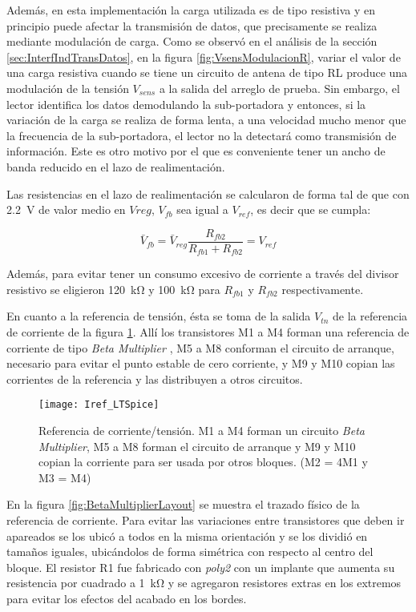 Además, en esta implementación la carga utilizada es de tipo 
resistiva y en principio puede afectar la transmisión de datos, que 
precisamente se realiza mediante modulación de carga. Como se 
observó en el análisis de la sección \ref{sec:InterfIndTransDatos}, 
en la figura \ref{fig:VsensModulacionR}, variar el valor de una 
carga resistiva cuando se tiene un circuito de antena de tipo RL 
produce una modulación de la tensión \(V_{sens}\) a la salida del 
arreglo de prueba. Sin embargo, el lector identifica los datos 
demodulando la sub-portadora y entonces, si la variación de la carga 
se realiza de forma lenta, a una velocidad mucho menor que la 
frecuencia de la sub-portadora, el lector no la detectará como 
transmisión de información. Este es otro motivo por el que es 
conveniente tener un ancho de banda reducido en el lazo de 
realimentación. 

Las resistencias en el lazo de realimentación se calcularon de forma 
tal de que con \SI{2.2}{\volt} de valor medio en \(Vreg\), \(V_{fb}\) 
sea igual a \(V_{ref}\), es decir que se cumpla:

\begin{equation*}
	\bar{V}_{fb} = \bar{V}_{reg} \frac{R_{fb2}}{R_{fb1}+R_{fb2}} = V_{ref}
\end{equation*}

Además, para evitar tener un consumo excesivo de corriente a través del 
divisor resistivo se eligieron \SI{120}{\kilo\ohm} y 
\SI{100}{\kilo\ohm} para \(R_{fb1}\) y \(R_{fb2}\) 
respectivamente.

\bigskip
En cuanto a la referencia de tensión, ésta se toma de la salida 
\(V_{tn}\) de la referencia de corriente de la figura 
\ref{fig:BetaMultiplierCircuito}. Allí los transistores M1 a M4 forman 
una referencia de corriente de tipo \emph{Beta Multiplier} \cite{Baker},
M5 a M8 conforman el circuito de arranque, necesario para evitar el punto 
estable de cero corriente, y M9 y M10 copian las corrientes de la 
referencia y las distribuyen a otros circuitos.

\begin{figure}
	\centering
	\texttt{[image: Iref\_LTSpice]}
	\caption{Referencia de corriente/tensión. M1 a M4 forman un 
	circuito \emph{Beta Multiplier}, M5 a M8 forman el circuito de 
	arranque y M9 y M10 copian la corriente para ser usada por otros 
	bloques. (M2 = 4M1 y M3 = M4)}
	\label{fig:BetaMultiplierCircuito}
\end{figure}

En la figura \ref{fig:BetaMultiplierLayout} se muestra el trazado 
físico de la referencia de corriente. Para evitar las variaciones 
entre transistores que deben ir apareados se los ubicó a todos en la 
misma orientación y se los dividió en tamaños iguales, ubicándolos 
de forma simétrica con respecto al centro del bloque. El resistor R1 
fue fabricado con \emph{poly2} con un implante que aumenta su 
resistencia por cuadrado a \SI{1}{\kilo\ohm} y se agregaron resistores 
extras en los extremos para evitar los efectos del acabado en los 
bordes.

